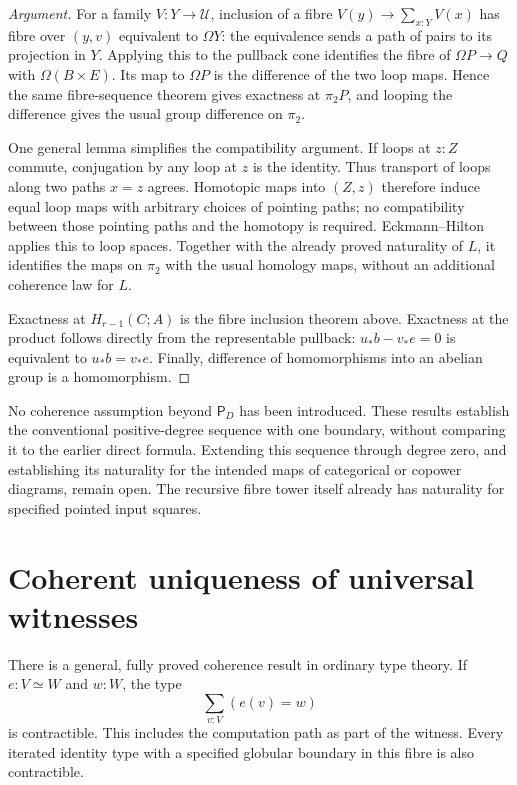 \documentclass[11pt,a4paper]{amsart}
\theoremstyle{definition}
\newcommand{\U}{\mathcal U}
\newcommand{\PD}{\mathsf P_D}
\begin{document}
\begin{proof}[Argument]
For a family $V:Y\to\U$, inclusion of a fibre
$V(y)\to\sum_{x:Y}V(x)$ has fibre over $(y,v)$ equivalent to
$\Omega Y$: the equivalence sends a path of pairs to its projection
in $Y$. Applying this to the pullback cone identifies the fibre of
$\Omega P\to Q$ with $\Omega(B\times E)$. Its map to $\Omega P$ is
the difference of the two loop maps. Hence the same fibre-sequence
theorem gives exactness at $\pi_2P$, and looping the difference gives
the usual group difference on $\pi_2$.

One general lemma simplifies the compatibility argument. If loops at
$z:Z$ commute, conjugation by any loop at $z$ is the identity.
Thus transport of loops along two paths $x=z$ agrees. Homotopic maps
into $(Z,z)$ therefore induce equal loop maps with arbitrary choices
of pointing paths; no compatibility between those pointing paths
and the homotopy is required. Eckmann--Hilton applies this to loop
spaces. Together with the already proved naturality of $L$, it
identifies the maps on $\pi_2$ with the usual homology maps, without
an additional coherence law for $L$.

Exactness at $H_{r-1}(C;A)$ is the fibre inclusion theorem above.
Exactness at the product follows directly from the representable
pullback: $u_*b-v_*e=0$ is equivalent to $u_*b=v_*e$. Finally,
difference of homomorphisms into an abelian group is a homomorphism.
\end{proof}

No coherence assumption beyond $\PD$ has been introduced. These
results establish the conventional positive-degree sequence with one
boundary, without comparing it to the earlier direct formula.
Extending this sequence through degree zero, and establishing its
naturality for the intended maps of categorical or copower diagrams,
remain open. The recursive fibre tower itself already has naturality
for specified pointed input squares.

\section{Coherent uniqueness of universal witnesses}
\label{sec:witnesses}

There is a general, fully proved coherence result in ordinary type
theory. If $e:V\simeq W$ and $w:W$, the type
\[
 \sum_{v:V}(e(v)=w)
\]
is contractible. This includes the computation path as part of the
witness. Every iterated identity type with a specified globular boundary
in this fibre is also contractible.
\end{document}
